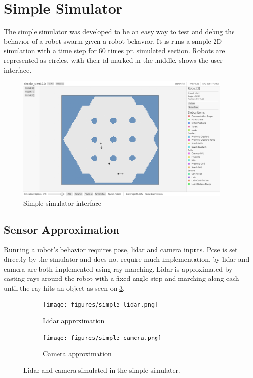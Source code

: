 \section{Simple Simulator}
The simple simulator was developed to be an easy way to test and debug the behavior of a robot swarm given a robot behavior. It is runs a simple 2D simulation with a time step for 60 times pr. simulated section. Robots are represented as circles, with their id marked in the middle.  shows the user interface.

\begin{figure}
    \begin{center}
        \includegraphics[width=0.95\textwidth]{figures/simple-sim-gui.png}
    \end{center}
    \caption{Simple simulator interface}\label{fig:simple-sim-interface}
\end{figure}


\subsection{Sensor Approximation}
Running a robot's behavior requires pose, lidar and camera inputs. Pose is set directly by the simulator and does not require much implementation, by lidar and camera are both implemented using {\color{red} ray marching}. Lidar is approximated by casting rays around the robot with a fixed angle step and marching along each until the ray hits an object as seen on \cref{fig:lidar-approximation}.


\begin{figure}
    \centering

    \begin{subfigure}[b]{0.45\textwidth}
        \centering
        \texttt{[image: figures/simple-lidar.png]}
        \caption{Lidar approximation}
        \label{fig:lidar-approximation}
    \end{subfigure}
    \begin{subfigure}[b]{0.45\textwidth}
        \centering
        \texttt{[image: figures/simple-camera.png]}
        \caption{Camera approximation}
        \label{fig:lidar-approximation}
    \end{subfigure}

    \caption{Lidar and camera simulated in the simple simulator.}\label{fig:sensor-approximation}
\end{figure}



